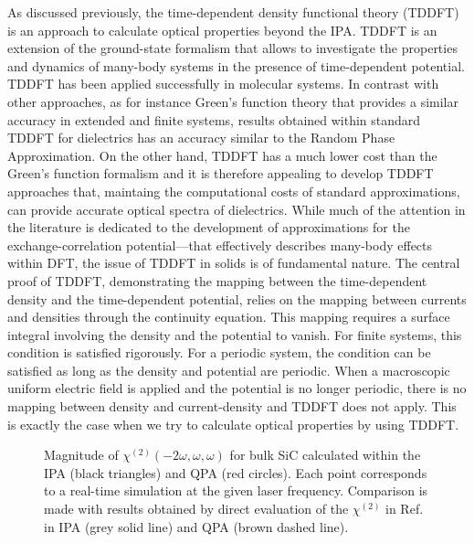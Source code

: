 As discussed previously, the time-dependent density functional theory (TDDFT)  is an approach to calculate optical properties beyond the IPA.
TDDFT is an extension of the ground-state formalism that allows to investigate the properties and dynamics of many-body systems in the presence of time-dependent potential.\cite{PhysRevLett.52.997} 
TDDFT has been applied successfully in molecular systems. In contrast with other approaches, as for instance Green's function theory\cite{strinati} that provides a similar accuracy in extended\cite{Aulbur19991} and finite systems\cite{li2019comparing}, results obtained within standard TDDFT for dielectrics has an accuracy similar to the Random Phase Approximation.
On the other hand, TDDFT has a much lower cost than the Green's function formalism and it is therefore appealing to develop TDDFT approaches that, maintaing the computational costs of standard approximations, can provide accurate optical spectra of dielectrics.   
While much of the attention in the literature is dedicated to the development of approximations for the exchange-correlation potential---that effectively describes many-body effects within DFT, the issue of TDDFT in solids is of fundamental nature. The central proof of TDDFT, demonstrating the mapping between the time-dependent density and the time-dependent potential, relies on the mapping between currents and densities through the continuity equation. This mapping requires a surface integral involving the density and the potential to vanish. For finite systems, this condition is satisfied rigorously. For a periodic system, the condition can be satisfied as long as the density and potential are periodic. When a macroscopic uniform electric field is applied and the potential is no longer periodic, there is no mapping between density and current-density and TDDFT does not apply.\cite{Gonze1995} This is exactly the case when we try to calculate optical properties by using TDDFT. 

\begin{figure}
\centering
{}
\caption{\footnotesize{Magnitude of $\chi^{(2)}(-2\omega,\omega,\omega)$ for bulk SiC calculated within the IPA (black triangles) and QPA (red circles). Each point corresponds to a real-time simulation at the given laser frequency. Comparison is made with results obtained \ai by direct evaluation of the $\chi^{(2)}$ in Ref.~\cite{PhysRevB.82.235201} in IPA (grey solid line) and QPA (brown dashed line).  \label{fg:SiCQPRPA} }}
\end{figure}


